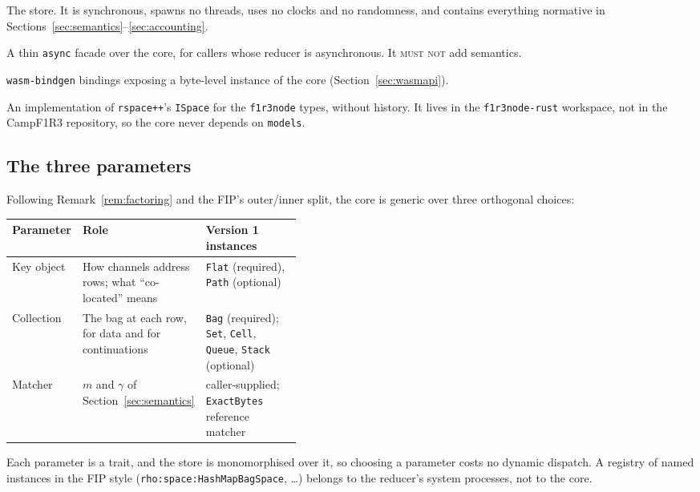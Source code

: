 \documentclass[11pt]{article}
\theoremstyle{plain}
\theoremstyle{definition}
\newcommand{\Camp}{CampF1R3}
\newcommand{\MUSTNOT}{\textsc{must not}}
\newcommand{\code}[1]{\texttt{#1}}
\begin{document}
\begin{description}[nosep,leftmargin=1.5em,style=nextline]
\item[\code{campf1r3-core}] The store. It is synchronous, spawns no threads, uses no
  clocks and no randomness, and contains everything normative in
  Sections~\ref{sec:semantics}--\ref{sec:accounting}.
\item[\code{campf1r3-async}] A thin \code{async} facade over the core, for callers
  whose reducer is asynchronous. It \MUSTNOT{} add semantics.
\item[\code{campf1r3-wasm}] \code{wasm-bindgen} bindings exposing a byte-level
  instance of the core (Section~\ref{sec:wasmapi}).
\item[\code{campf1r3-ispace}] An implementation of \code{rspace++}'s \code{ISpace}
  for the \code{f1r3node} types, without history. It lives in the
  \code{f1r3node-rust} workspace, not in the \Camp{} repository, so the core never
  depends on \code{models}.
\end{description}

\subsection{The three parameters}

Following Remark~\ref{rem:factoring} and the FIP's outer/inner split, the core is
generic over three orthogonal choices:
\begin{center}
\begin{tabularx}{\linewidth}{@{}l>{\raggedright\arraybackslash}X>{\raggedright\arraybackslash}p{0.42\linewidth}@{}}
\toprule
Parameter & Role & Version 1 instances\\
\midrule
Key object & How channels address rows; what ``co-located'' means & \code{Flat} (required), \code{Path} (optional)\\
Collection & The bag at each row, for data and for continuations & \code{Bag} (required); \code{Set}, \code{Cell}, \code{Queue}, \code{Stack} (optional)\\
Matcher & $m$ and $\gamma$ of Section~\ref{sec:semantics} & caller-supplied; \code{ExactBytes} reference matcher\\
\bottomrule
\end{tabularx}
\end{center}
Each parameter is a trait, and the store is monomorphised over it, so choosing a
parameter costs no dynamic dispatch. A registry of named instances in the FIP
style (\code{rho:space:HashMapBagSpace}, \dots) belongs to the reducer's system
processes, not to the core.
\end{document}

